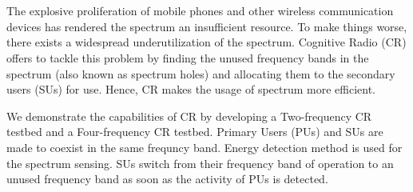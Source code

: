 \chapter*{}
The explosive proliferation of mobile phones and other wireless communication
devices has rendered the spectrum an insufficient resource. To make things
worse, there exists a widespread underutilization of the spectrum. Cognitive
Radio (CR) offers to tackle this problem by finding the unused frequency bands
in the spectrum (also known as spectrum holes) and allocating them to the
secondary users (SUs) for use. Hence, CR makes the usage of spectrum more
efficient.

We demonstrate the capabilities of CR by developing a Two-frequency CR testbed
and a Four-frequency CR testbed. Primary Users (PUs) and SUs are made to
coexist in the same frequncy band. Energy detection method is used for the
spectrum sensing. SUs switch from their frequency band of operation to an
unused frequency band as soon as the activity of PUs is detected.